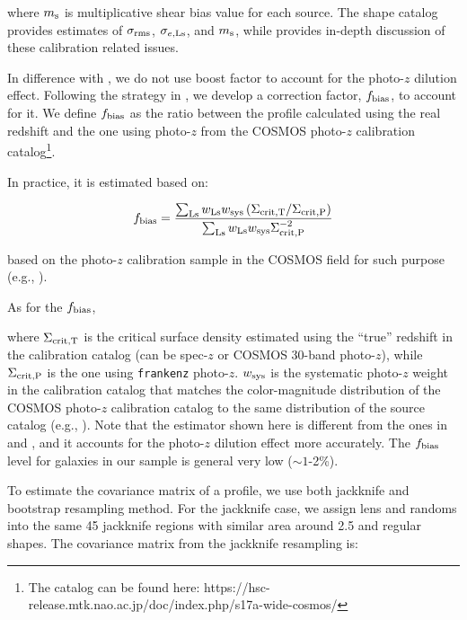 \documentclass[fleqn,usenatbib,useAMS,english]{mnras}
\begin{document}
    \noindent where $m_{\rm s}$ is multiplicative shear bias value for each source.
    The shape catalog provides estimates of $\sigma_{\rm rms}$, $\sigma_{e, \rm Ls}$, and $m_{\rm
    s}$, while \citet{HSC-WLCALIB} provides in-depth discussion of these calibration related
    issues.

    In difference with \citet{Singh2017}, we do not use boost factor to account for the photo-$z$
    dilution effect.
    Following the strategy in \citet{Leauthaud2017}, we develop a correction
    factor, $f_{\rm bias}$, to account for it.
    We define $f_{\rm bias}$ as the ratio between the \dsigma{} profile calculated using
    the real redshift and the one using photo-$z$ from the COSMOS photo-$z$ calibration
    catalog\footnote{The catalog can be found here:
    https://hsc-release.mtk.nao.ac.jp/doc/index.php/s17a-wide-cosmos/}.

    In practice, it is estimated based on:

    \begin{equation}
        f_{\rm bias} = \frac{\sum_{\rm Ls} w_{\rm Ls} w_{\rm sys}
            \left(\Sigma_{{\rm crit, T}} / \Sigma_{{\rm crit, P}} \right)}{
            \sum_{\rm Ls} w_{\rm Ls} w_{\rm sys} \Sigma^{-2}_{\rm crit, P}}
        \label{eq:fbias}
    \end{equation}

    based on the photo-$z$ calibration sample in the COSMOS field for
    such purpose
    (e.g., \citealt{Mandelbaum2008, Nakajima2012, Leauthaud2017}).

    As for the $f_{\rm bias}$,

    \noindent where $\Sigma_{{\rm crit, T}}$ is the critical surface density estimated using the
    ``true'' redshift in the calibration catalog (can be spec-$z$ or COSMOS 30-band photo-$z$),
    while $\Sigma_{{\rm crit, P}}$ is the one using \texttt{frankenz} photo-$z$.
    $w_{\rm sys}$ is the systematic photo-$z$ weight in the calibration catalog that matches the
    color-magnitude distribution of the COSMOS photo-$z$ calibration catalog to the same
    distribution of the source catalog (e.g., \citealt{Mandelbaum2008, Nakajima2012}).
    Note that the estimator shown here is different from the ones in \citet{Leauthaud2017} and
    \citet{Speagle2019}, and it accounts for the photo-$z$ dilution effect more accurately.
    The $f_{\rm bias}$ level for galaxies in our sample is general very low ($\sim 1$-2\%).

    To estimate the covariance matrix of a \dsigma{} profile, we use both jackknife and
    bootstrap resampling method.
    For the jackknife case, we assign lens and randoms into the same 45 jackknife regions with
    similar area around 2.5 \sqdeg{} and regular shapes.
    The covariance matrix from the jackknife resampling is:
\end{document}
